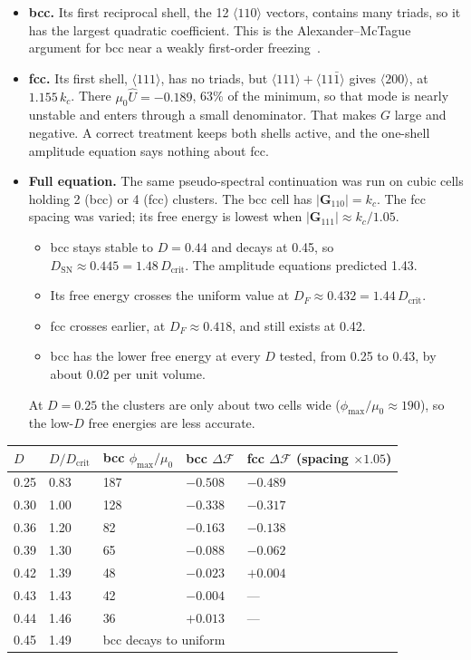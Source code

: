 \documentclass[11pt]{article}
\newcommand{\Uh}{\hat U}
\begin{document}
\begin{itemize}
  \item \textbf{bcc.} Its first reciprocal shell, the 12 $\langle110\rangle$
        vectors, contains many triads, so it has the largest quadratic
        coefficient. This is the Alexander--McTague argument for bcc near a
        weakly first-order freezing~\cite{alexander}.
  \item \textbf{fcc.} Its first shell, $\langle111\rangle$, has no triads, but
        $\langle111\rangle+\langle11\bar1\rangle$ gives $\langle200\rangle$, at
        $1.155\,k_c$. There $\mu_0\Uh = -0.189$, 63\% of the minimum, so that
        mode is nearly unstable and enters through a small denominator. That
        makes $G$ large and negative. A correct treatment keeps both shells
        active, and the one-shell amplitude equation says nothing about fcc.
  \item \textbf{Full equation.} The same pseudo-spectral continuation was run
        on cubic cells holding 2 (bcc) or 4 (fcc) clusters. The bcc cell has
        $|\mathbf G_{110}| = k_c$. The fcc spacing was varied; its free energy
        is lowest when $|\mathbf G_{111}|\approx k_c/1.05$.
        \begin{itemize}
          \item bcc stays stable to $D=0.44$ and decays at 0.45, so
                $D_{\mathrm{SN}}\approx0.445 = 1.48\,D_{\mathrm{crit}}$. The
                amplitude equations predicted 1.43.
          \item Its free energy crosses the uniform value at
                $D_F\approx0.432 = 1.44\,D_{\mathrm{crit}}$.
          \item fcc crosses earlier, at $D_F\approx0.418$, and still exists
                at 0.42.
          \item bcc has the lower free energy at every $D$ tested, from 0.25
                to 0.43, by about 0.02 per unit volume.
        \end{itemize}
        At $D=0.25$ the clusters are only about two cells wide
        ($\phi_{\max}/\mu_0\approx190$), so the low-$D$ free energies are less
        accurate.
\end{itemize}
\begin{center}
\begin{tabular}{@{}lllll@{}}
\toprule
$D$ & $D/D_{\mathrm{crit}}$ & bcc $\phi_{\max}/\mu_0$ & bcc $\Delta\mathcal F$ & fcc $\Delta\mathcal F$ (spacing $\times1.05$) \\
\midrule
0.25 & 0.83 & 187 & $-0.508$ & $-0.489$ \\
0.30 & 1.00 & 128 & $-0.338$ & $-0.317$ \\
0.36 & 1.20 & 82 & $-0.163$ & $-0.138$ \\
0.39 & 1.30 & 65 & $-0.088$ & $-0.062$ \\
0.42 & 1.39 & 48 & $-0.023$ & $+0.004$ \\
0.43 & 1.43 & 42 & $-0.004$ & --- \\
0.44 & 1.46 & 36 & $+0.013$ & --- \\
0.45 & 1.49 & \multicolumn{3}{l}{bcc decays to uniform} \\
\bottomrule
\end{tabular}
\end{center}
\end{document}
